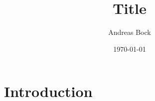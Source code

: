 \documentclass[10pt]{article}
\title{Title}
\author{Andreas Bock}
\date{\today}
\begin{document}
\maketitle
\tableofcontents

\section{Introduction}

\printbibliography
\end{document}
